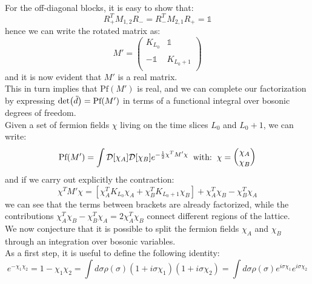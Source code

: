 \\ For the off-diagonal blocks, it is easy to show that:
\begin{equation}
    R_+^T M_{1,2} R_- = R_-^T M_{2,1} R_+ = \mathbb{1}
\end{equation}
hence we can write the rotated matrix as:
\begin{equation}
    M' = \begin{pmatrix}
        K_{L_0} & \mathbb{1} \\
        \\
        -\mathbb{1} & K_{L_0 + 1} \\
    \end{pmatrix}
\end{equation}
and it is now evident that $M'$ is a real matrix.
\\ This in turn implies that $\textrm{Pf}(M')$ is real, and we can complete our factorization by expressing $\det(\Tilde{d}) = \textrm{Pf}(M')$ in terms of a functional integral over bosonic degrees of freedom. \\ Given a set of fermion fields $\chi$ living on the time slices $L_0$ and $L_0 + 1$, we can write:
\begin{equation}\label{Begin Pfaffian}
    \textrm{Pf}(M') = \int \mathcal{D}[\chi_A]  \mathcal{D}[\chi_B] e^{-\frac{1}{2} \chi^T M' \chi} \hspace{2mm} \mbox{with:} \hspace{2mm} \chi = \begin{pmatrix}
        \chi_A \\ \chi_B \\ 
    \end{pmatrix}
\end{equation}
and if we carry out explicitly the contraction:
\begin{equation}
    \chi^T M' \chi = \left[\chi^T_A K_{L_0} \chi_A + \chi_B^T K_{L_0 + 1} \chi_B \right] + \chi_A^T \chi_B - \chi_B^T \chi_A
\end{equation}
we can see that the terms between brackets are already factorized, while the contributions $\chi_A^T \chi_B - \chi_B^T\chi_A = 2\chi_A^T \chi_B$ connect different regions of the lattice. \\ We now conjecture that it is possible to split the fermion fields $\chi_A$ and $\chi_B$ through an integration over bosonic variables.
\\ As a first step, it is useful to define the following identity:
\begin{equation}\label{sigma identity}
    e^{-\chi_1 \chi_2} = 1 - \chi_1 \chi_2 = \int d\sigma \rho(\sigma) (1 + i \sigma \chi_1) (1 + i \sigma \chi_2) = \int d\sigma \rho(\sigma) e^{i\sigma\chi_1} e^{i\sigma \chi_2}
\end{equation}
